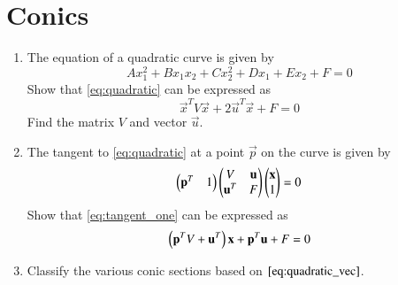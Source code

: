 \documentclass[journal,12pt,twocolumn]{IEEEtran}
\renewcommand\thesection{\arabic{section}}
\begin{document}
\section{Conics}
\begin{enumerate}[label=\thesection.\arabic*
,ref=\thesection.\theenumi]
\item The equation of a quadratic curve is given by
\begin{equation}
Ax_1^2+Bx_1x_2+Cx_2^2+Dx_1+Ex_2+F = 0
\label{eq:quadratic}
\end{equation}
%
Show that  \eqref{eq:quadratic} can be expressed as
\begin{equation}
\vec{x}^TV\vec{x}+2\vec{u}^T\vec{x}+ F = 0
\label{eq:quadratic_vec}
\end{equation}
%
Find the matrix $V$ and vector $\vec{u}$.
\item The tangent to \eqref{eq:quadratic} at a point $\vec{p}$ on the curve is given by
\begin{equation}
\begin{pmatrix}\mathbf{p}^T & 1\end{pmatrix}\begin{pmatrix}V & \mathbf{u} \\ \mathbf{u}^T & F\end{pmatrix} \begin{pmatrix}\mathbf{x} \\ 1\end{pmatrix} = 0
\label{eq:tangent_one}
\end{equation}
%
Show that \eqref{eq:tangent_one} can be expressed as
\begin{equation}
\left(\mathbf{p}^TV+\mathbf{u}^T\right)\mathbf{x} + \mathbf{p}^T\mathbf{u} +F = 0
\label{eq:tangent}
\end{equation}
\item Classify the various conic sections based on $\eqref{eq:quadratic_vec}$.
\\
\solution 
%

\end{enumerate}
\end{document}
